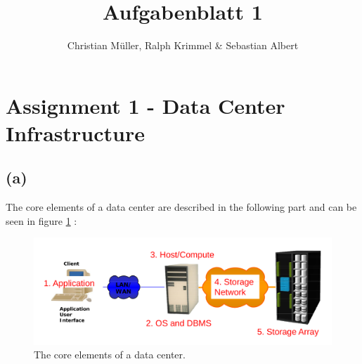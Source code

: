 \documentclass{article}
\begin{document}
\title{Aufgabenblatt 1}
\author{Christian Müller, Ralph Krimmel \& Sebastian Albert }

\maketitle


\section*{Assignment 1 - Data Center Infrastructure}

\subsection*{(a)}
	The core elements of a data center are described in the following part and can be seen in figure \ref{fig:coredata} :

	\begin{figure}[t]
		\begin{center}
			\includegraphics[width=\textwidth]{pic/datacenter.png}
		\end{center}
		\caption{The core elements of a data center.}
		\label{fig:coredata}
	\end{figure}
\end{document}
